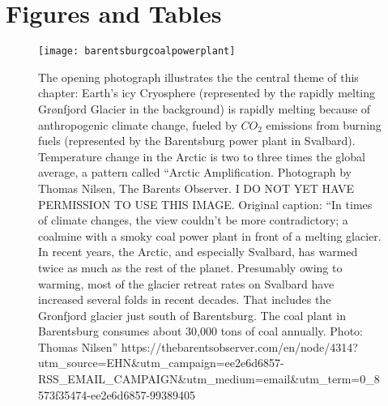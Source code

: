 \section{Figures and Tables}

\begin{figure}[p]
\centering
\texttt{[image: barentsburgcoalpowerplant]}%
\caption{The opening photograph illustrates the the central theme of this chapter: Earth's icy Cryosphere (represented by the rapidly melting Gr\o nfjord Glacier in the background) is rapidly melting because of anthropogenic climate change, fueled by $CO_2$ emissions from burning  fuels (represented by the Barentsburg power plant in Svalbard). Temperature change in the Arctic is two to three times the global average, a pattern called ``Arctic Amplification. Photograph by Thomas Nilsen, The Barents Observer. I DO NOT YET HAVE PERMISSION TO USE THIS IMAGE. Original caption: ``In times of climate changes, the view couldn't be more contradictory; a coalmine with a smoky coal power plant in front of a melting glacier. In recent years, the Arctic, and especially Svalbard, has warmed twice as much as the rest of the planet. Presumably owing to warming, most of the glacier retreat rates on Svalbard have increased several folds in recent decades. That includes the Gronfjord glacier just south of Barentsburg. The coal plant in Barentsburg consumes about 30,000 tons of coal annually.  Photo: Thomas Nilsen'' https://thebarentsobserver.com/en/node/4314?utm\_source=EHN\&utm\_campaign=ee2e6d6857-RSS\_EMAIL\_CAMPAIGN\&utm\_medium=email\&utm\_term=0\_8573f35474-ee2e6d6857-99389405} 
\label{fig:Barentsburg}
\end{figure}


